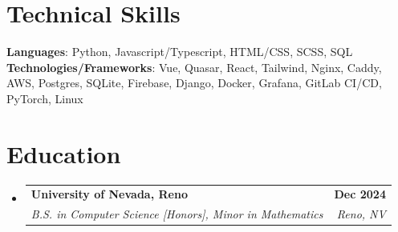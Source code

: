 \documentclass[letterpaper,11pt]{article}
\makeatletter
\newcommand{\resumeSubheading}[4]{
  \vspace{-2pt}\item
    \begin{tabular*}{1.0\textwidth}[t]{l@{\extracolsep{\fill}}r}
      \textbf{#1} & \textbf{\small #2} \\
      \textit{\small#3} & \textit{\small #4} \\
    \end{tabular*}\vspace{-7pt}
}
\newcommand{\resumeSubHeadingListStart}{\begin{itemize}[leftmargin=0.0in, label={}]}
\newcommand{\resumeSubHeadingListEnd}{\end{itemize}}
\makeatother
\begin{document}
%
\section{Technical Skills}
 \begin{itemize}[leftmargin=0.15in, label={}]
    \small{\item{
     \textbf{Languages}{: Python, Javascript/Typescript, HTML/CSS, SCSS, SQL} \\
     \textbf{Technologies/Frameworks}{: Vue, Quasar, React, Tailwind, Nginx, Caddy, AWS, Postgres, SQLite, Firebase, Django, Docker, Grafana, GitLab CI/CD, PyTorch, Linux} \\
    }}
 \end{itemize}
 \vspace{-14pt}


\section{Education}
  \resumeSubHeadingListStart
    \resumeSubheading
      {University of Nevada, Reno}{Dec 2024}
      {B.S. in Computer Science [Honors], Minor in Mathematics}{Reno, NV}
  \resumeSubHeadingListEnd
\end{document}
